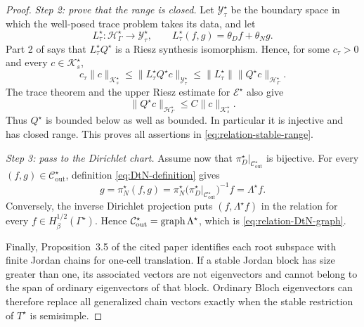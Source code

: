 \begin{proof}
\emph{Step 2: prove that the range is closed.}
Let $\mathcal Y_\tau^\star$ be the boundary space in which the well-posed
trace problem takes its data, and let
\[
  L_\tau^\star:\mathcal H_\Gamma^\star\to
  \mathcal Y_\tau^\star,
  \qquad L_\tau^\star(f,g)=\theta_Df+\theta_Ng.
\]
Part 2 of \cite[Theorem~2.2]{HohageSoussi2013} says that
$L_\tau^\star Q^\star$ is a Riesz synthesis isomorphism.  Hence, for some
$c_\tau>0$ and every $c\in\mathcal K_s^\star$,
\[
  c_\tau\lVert c\rVert_{\mathcal K_s^\star}
  \leq\lVert L_\tau^\star Q^\star c\rVert_{\mathcal Y_\tau^\star}
  \leq\lVert L_\tau^\star\rVert
  \lVert Q^\star c\rVert_{\mathcal H_\Gamma^\star}.
\]
The trace theorem and the upper Riesz estimate for $\mathcal E^\star$ also
give
\[
  \lVert Q^\star c\rVert_{\mathcal H_\Gamma^\star}
  \leq C\lVert c\rVert_{\mathcal K_s^\star}.
\]
Thus $Q^\star$ is bounded below as well as bounded.  In particular it is
injective and has closed range.  This proves all assertions in
\eqref{eq:relation-stable-range}.

\emph{Step 3: pass to the Dirichlet chart.}
Assume now that
$\pi_D^\star|_{\mathcal C^\star_{\mathrm{out}}}$ is bijective.  For every
$(f,g)\in\mathcal C^\star_{\mathrm{out}}$, definition
\eqref{eq:DtN-definition} gives
\[
  g=\pi_N^\star(f,g)
   =\pi_N^\star
    \bigl(\pi_D^\star|_{\mathcal C^\star_{\mathrm{out}}}\bigr)^{-1}f
   =\Lambda^\star f.
\]
Conversely, the inverse Dirichlet projection puts
$(f,\Lambda^\star f)$ in the relation for every
$f\in H^{1/2}_\beta(\Gamma^\star)$.  Hence
$\mathcal C^\star_{\mathrm{out}}=\operatorname{graph}\Lambda^\star$, which is
\eqref{eq:relation-DtN-graph}.

Finally, Proposition~3.5 of the cited paper identifies each root subspace with
finite Jordan chains for one-cell translation.  If a stable Jordan block has
size greater than one, its associated vectors are not eigenvectors and cannot
belong to the span of ordinary eigenvectors of that block.  Ordinary Bloch
eigenvectors can therefore replace all generalized chain vectors exactly when
the stable restriction of $T^\star$ is semisimple.
\end{proof}
